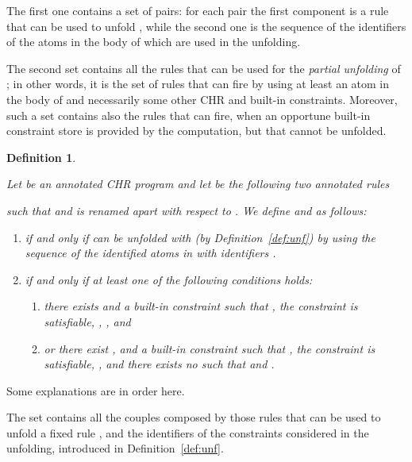 \documentclass{tlp}
\newtheorem{definition}{Definition} \newtheorem{proposition}{Proposition} \newtheorem{example}{Example} \newtheorem{corollary}{Corollary} \newtheorem{theorem}{Theorem} \newtheorem{lemma}{Lemma}
\begin{document}
The first one contains a set of pairs: for each pair the first
component is a rule that can be used to unfold , while the second one is the
sequence of the identifiers of the atoms in the body of  which
are used in the unfolding.

The second set contains all the rules that can be used for the
{\em partial unfolding} of ; in other words, it is the set of rules that can fire by
using at least an atom in the body of  and necessarily
some other CHR and built-in constraints. Moreover, such a set contains
also the rules that can fire, when an opportune built-in constraint
store is provided by the computation, but that cannot be unfolded.



\begin{definition}\label{def:Pposeneg}

Let  be an annotated CHR program and let  be the following two annotated rules

such that  and   is renamed
apart with respect to . We define  and  as follows:
\begin{enumerate}
    \item\label{uno}  
 if and only if
 can be
unfolded with  (by Definition~\ref{def:unf}) by using the sequence
of the identified atoms in  with identifiers .
    \item\label{due}  if and only if at least one of the
following conditions holds: \\
\begin{enumerate}
\item\label{ai} there exists  and
     a built-in constraint  such that
    , the constraint
     is satisfiable,
    , , and   \\
\item\label{bi} or there exist ,
     and
     a built-in constraint  such that
, the constraint
     is satisfiable,
    , and there exists no  such that
 and
.
\\
\end{enumerate}
\end{enumerate}
\end{definition}
Some explanations are in order here.

The set  contains all the couples composed by those rules that can be used to unfold a
fixed rule , and the identifiers of the constraints considered in the unfolding,
introduced in Definition~\ref{def:unf}.
\end{document}
